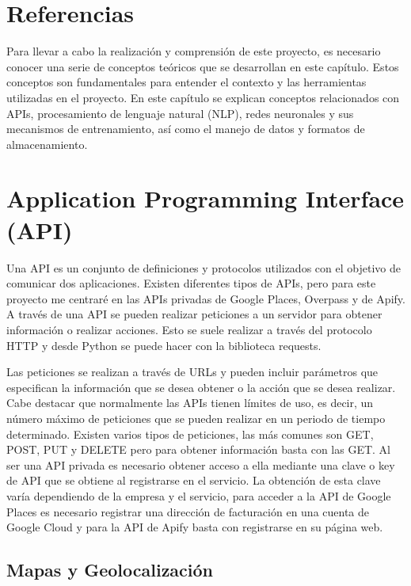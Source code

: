 
\section{Referencias}

Para llevar a cabo la realización y comprensión de este proyecto, es necesario conocer una serie de conceptos teóricos que se desarrollan en este capítulo. Estos conceptos son fundamentales para entender el contexto y las herramientas utilizadas en el proyecto.
En este capítulo se explican conceptos relacionados con APIs, procesamiento de lenguaje natural (NLP), redes neuronales y sus mecanismos de entrenamiento, así como el manejo de datos y formatos de almacenamiento.

\section{Application Programming Interface (API)}

Una API es un conjunto de definiciones y protocolos utilizados con el objetivo de comunicar dos aplicaciones. \cite{xataka:api}
Existen diferentes tipos de APIs, pero para este proyecto me centraré en las APIs privadas de Google Places, Overpass y de Apify.
A través de una API se pueden realizar peticiones a un servidor para obtener información o realizar acciones. Esto se suele realizar a través del protocolo HTTP y desde Python se puede hacer con la biblioteca requests.

Las peticiones se realizan a través de URLs y pueden incluir parámetros que especifican la información que se desea obtener o la acción que se desea realizar.
Cabe destacar que normalmente las APIs tienen límites de uso, es decir, un número máximo de peticiones que se pueden realizar en un periodo de tiempo determinado.
Existen varios tipos de peticiones, las más comunes son GET, POST, PUT y DELETE pero para obtener información basta con las GET.
Al ser una API privada es necesario obtener acceso a ella mediante una clave o key de API que se obtiene al registrarse en el servicio.
La obtención de esta clave varía dependiendo de la empresa y el servicio, para acceder a la API de Google Places es necesario registrar una dirección de facturación en una cuenta de Google Cloud y para la API de Apify basta con registrarse en su página web.


\subsection{Mapas y Geolocalización}

